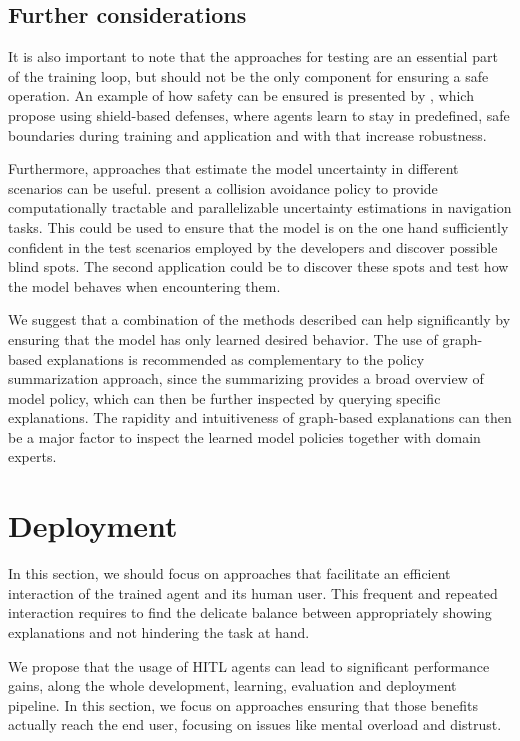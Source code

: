 \documentclass[twoside,11pt]{article}
\begin{document}
\subsection{Further considerations}
It is also important to note that the approaches for testing are an essential part of the training loop, but should not be the only component for ensuring a safe operation. An example of how safety can be ensured is presented by \citet{XiongEtAl:2020:Robustness}, which propose using shield-based defenses, where agents learn to stay in predefined, safe boundaries during training and application and with that increase robustness.

Furthermore, approaches that estimate the model uncertainty in different scenarios can be useful. \cite{LuetjensEverettHow:2018:RLModelUncertainty} present a collision avoidance policy to provide computationally tractable and parallelizable uncertainty estimations in navigation tasks. This could be used to ensure that the model is on the one hand sufficiently confident in the test scenarios employed by the developers and discover possible blind spots. The second application could be to discover these spots and test how the model behaves when encountering them.

We suggest that a combination of the methods described can help significantly by ensuring that the model has only learned desired behavior. The use of graph-based explanations is recommended as complementary to the policy summarization approach, since the summarizing provides a broad overview of model policy, which can then be further inspected by querying specific explanations. The rapidity and intuitiveness of graph-based explanations can then be a major factor to inspect the learned model policies together with domain experts.

\section{Deployment}

In this section, we should focus on approaches that facilitate an efficient interaction of the trained agent and its human user. This frequent and repeated interaction requires to find the delicate balance between appropriately showing explanations and not hindering the task at hand.

We propose that the usage of HITL agents can lead to significant performance gains, along the whole development, learning, evaluation and deployment pipeline. In this section, we focus on approaches ensuring that those benefits actually reach the end user, focusing on issues like mental overload and distrust.
\end{document}

